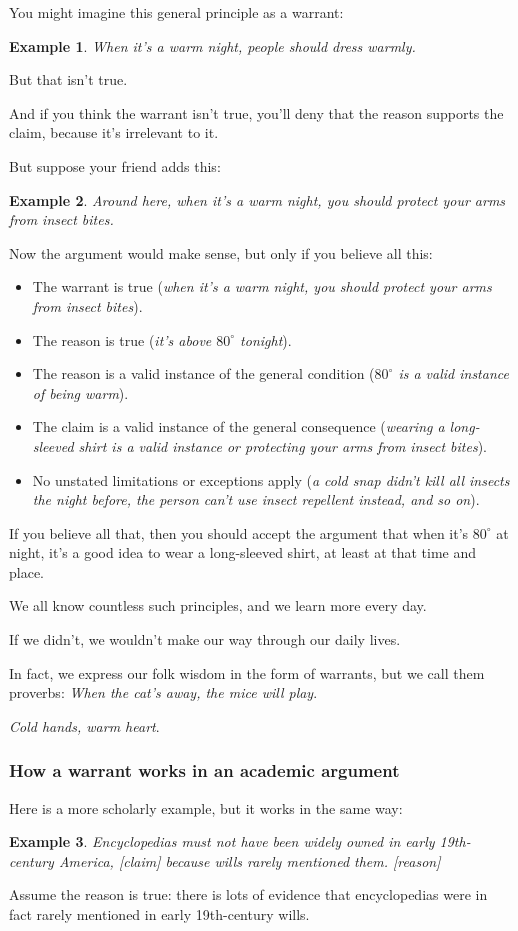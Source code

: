 \documentclass[oneside]{book}
\numberwithin{equation}{section}
\newtheorem{example}{Example}[section]
\begin{document}
You might imagine this general principle as a warrant:
\begin{example}
    When it's a warm night, people should dress warmly.
\end{example}
But that isn't true.

And if you think the warrant isn't true, you'll deny that the reason supports the claim, because it's irrelevant to it.

%
But suppose your friend adds this:
\begin{example}
    Around here, when it's a warm night, you should protect your arms from insect bites.
\end{example}
Now the argument would make sense, but only if you believe all this:
\begin{itemize}
    \item The warrant is true (\textit{when it's a warm night, you should protect your arms from insect bites}).
    \item The reason is true (\textit{it's above $80^\circ$ tonight}).
    \item The reason is a valid instance of the general condition (\textit{$80^\circ$ is a valid instance of being warm}).
    \item The claim is a valid instance of the general consequence (\textit{wearing a long-sleeved shirt is a valid instance or protecting your arms from insect bites}).
    \item No unstated limitations or exceptions apply (\textit{a cold snap didn't kill all insects the night before, the person can't use insect repellent instead, and so on}).
\end{itemize}
If you believe all that, then you should accept the argument that when it's $80^\circ$ at night, it's a good idea to wear a long-sleeved shirt, at least at that time and place.

%
We all know countless such principles, and we learn more every day.

If we didn't, we wouldn't make our way through our daily lives.

In fact, we express our folk wisdom in the form of warrants, but we call them proverbs: \textit{When the cat's away, the mice will play}.


\textit{Cold hands, warm heart}.

\subsubsection{How a warrant works in an academic argument}
Here is a more scholarly example, but it works in the same way:
\begin{example}
    Encyclopedias must not have been widely owned in early 19th-century America, \emph{[claim]} because wills rarely mentioned them. \emph{[reason]}
\end{example}
Assume the reason is true: there is lots of evidence that encyclopedias were in fact rarely mentioned in early 19th-century wills.
\end{document}
